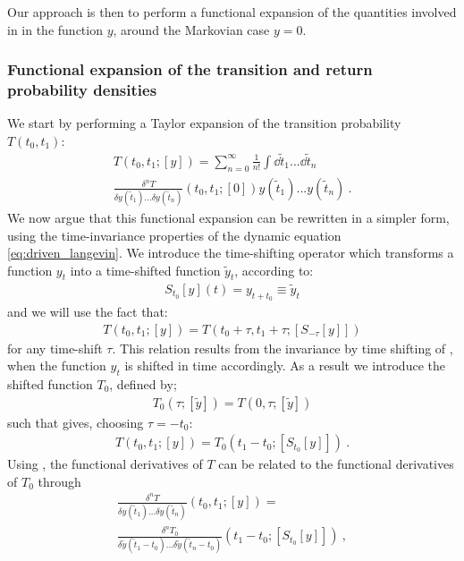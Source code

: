 \documentclass[%
 reprint,
superscriptaddress,
nofootinbib,
 amsmath,amssymb,
 aps,
prx,
]{revtex4-2}
\begin{document}
Our approach is then to perform a functional expansion of the quantities involved in  in the function $y$, around the Markovian case $y=0$. 

\subsubsection{Functional expansion of the transition and return probability densities}

We start by performing a Taylor expansion of the transition probability $T(t_0, t_1)$:
\begin{multline}
  T(t_0,t_1;[y]) 
  =\sum_{n=0}^{\infty}\frac{1}{n!} \int  \dd{\tilde{t}_1}...\dd{\tilde{t}_n}  \\
   \frac{\delta^n T }{\delta y(\tilde{t}_1)...\delta y(\tilde{t}_n)}(t_0,t_1;[0]) y(\tilde{t}_1)...y(\tilde{t}_n)~.
\end{multline}
We now argue that this functional expansion can be rewritten in a simpler form, using the time-invariance properties of the dynamic equation \eqref{eq:driven_langevin}. We introduce the time-shifting operator which transforms a function $y_t$ into a time-shifted function $\tilde{y}_t$, according to:
\begin{align}
S_{t_0}[y](t)=y_{t+t_0}\equiv\tilde{y}_t
\end{align}
and we will use the fact that:
\begin{align}
\label{eq:time_shifting_invariance}
  T(t_0,t_1;[y]) =  T(t_0+\tau,t_1+\tau;[S_{-\tau}[y]])
\end{align}
for any time-shift $\tau$. This relation results from the invariance by time shifting of , when the function $y_t$ is shifted in time accordingly. As a result we introduce the shifted function $T_0$, defined by;
\begin{align}
\label{eq:definition_T_0}
T_0(\tau; [\tilde{y}])=T(0, \tau; [\tilde{y}])
\end{align}
such that  gives, choosing $\tau=-t_0$:
\begin{align}
\label{eq:main_identity_time_shifting}
T(t_0,t_1;[y])=T_0(t_1-t_0; [S_{t_0}[y]])~.
\end{align}
Using , the functional derivatives of $T$ can be related to the functional derivatives of $T_0$ through
\begin{multline}
\frac{\delta^n T}{\delta y(\tilde{t}_1)...\delta y(\tilde{t}_n)} (t_0,t_1;[y]) =\\
\frac{\delta^n T_0}{\delta \tilde{y}(\tilde{t}_1-t_0)...\delta \tilde{y}(\tilde{t}_n-t_0)}  (t_1-t_0;[S_{t_0}[y]])~,
  \end{multline}
\end{document}
